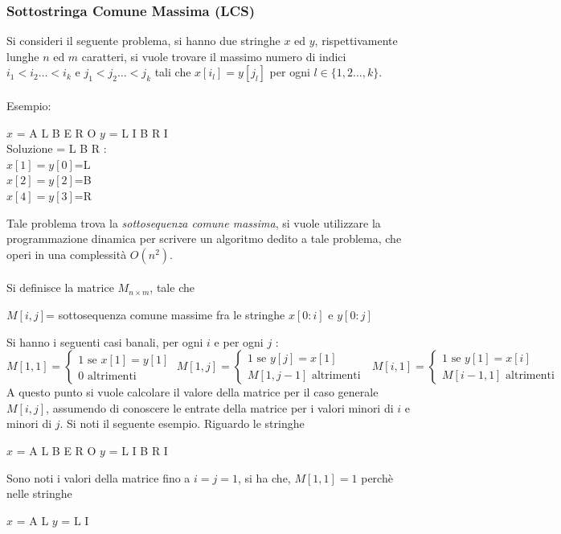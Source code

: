 \documentclass[12pt, letterpaper]{article}
\newcommand{\acc}{\\\hphantom{}\\}
\begin{document}
\subsubsection{Sottostringa Comune Massima (LCS)}
Si consideri il seguente problema, si hanno due stringhe $x$ ed $y$, rispettivamente 
lunghe $n$ ed $m$ caratteri, si vuole trovare il massimo numero di 
indici $i_1<i_2\dots <i_k$ e $j_1<j_2\dots <j_k$ tali che $x[i_l]=y[j_l]$ 
per ogni $l\in \{1,2\dots,k\}$.\acc 
Esempio:\begin{center}
    $x$ = A L B E R O \hphantom{spaziospazio}
    $y$ = L I B R I \\ 
    Soluzione = L B R :\\  $x[1]=y[0]$=L\\  $x[2]=y[2]$=B\\ $x[4]=y[3]$=R
\end{center}
Tale problema trova la \textit{sottosequenza comune massima}, si vuole utilizzare 
la programmazione dinamica per scrivere un algoritmo dedito a tale problema, che operi 
in una complessità $O(n^2)$.\acc 
Si definisce la matrice $M_{n\times m}$, tale che\begin{center}
$M[i,j]$= sottosequenza comune massime fra le stringhe
 $x[0:i]$ e $y[0:j]$\end{center}
Si hanno i seguenti casi banali, per ogni $i$ e per ogni $j$ :$$ M[1,1]=\begin{cases}
    1 \text{ se } x[1]=y[1]\\ 
    0 \text{ altrimenti }
\end{cases}\;
M[1,j]=\begin{cases}
    1 \text{ se } y[j]=x[1]\\ 
    M[1,j-1] \text{ altrimenti }
\end{cases}\;
M[i,1]=\begin{cases}
    1 \text{ se } y[1]=x[i]\\ 
    M[i-1,1] \text{ altrimenti }
\end{cases}$$
A questo punto si vuole calcolare il valore della matrice per il caso generale $M[i,j]$, assumendo di conoscere le entrate 
della matrice per i valori minori di $i$ e minori di $j$. Si noti il seguente esempio. 
Riguardo le stringhe 
\begin{center}
    $x$ = A L B E R O \hphantom{spaziospazio}
    $y$ = L I B R I
\end{center}
Sono noti i valori della matrice fino a $i=j=1$, si ha che, $M[1,1]=1$ perchè nelle stringhe 
\begin{center}
    $x$ = A L  \hphantom{spaziospazio}
    $y$ = L I 
\end{center}
\end{document}
